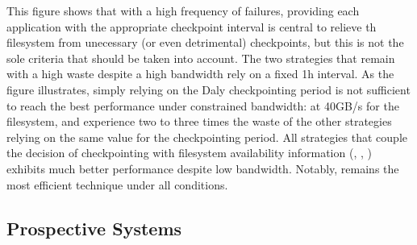 This figure shows that with a high frequency of failures, providing
each application with the appropriate checkpoint interval is central
to relieve th filesystem from unecessary (or even detrimental)
checkpoints, but this is not the sole criteria that should be taken
into account. The two strategies that remain with a high waste despite
a high bandwidth rely on a fixed 1h interval. As the figure
illustrates, simply relying on the Daly checkpointing period is not
sufficient to reach the best performance under constrained bandwidth:
at 40GB/s for the filesystem, \propdaly and \bfifodaly experience two
to three times the waste of the other strategies relying on the same
value for the checkpointing period. All strategies that couple the
decision of checkpointing with filesystem availability information
(\fifodaly, \fifofixed, \cooperative) exhibits much better performance
despite low bandwidth. Notably, \cooperative remains the most
efficient technique under all conditions.

\subsection{Prospective Systems}

